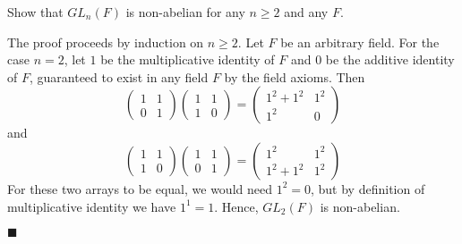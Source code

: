 \documentclass[12pt]{article}
\renewcommand{\qed}{\hfill$\blacksquare$}
\renewenvironment{proof}{\begin{addmargin}[1em]{0em}\begin{newproof}}{\end{newproof}\end{addmargin}\qed}
\newenvironment{problem}[2][Exercise]{\begin{trivlist}
\item[\hskip \labelsep {\bfseries #1}\hskip \labelsep {\bfseries #2.}]}{\end{trivlist}}
\begin{document}
\begin{problem}{1.4.8}
Show that $GL_n\left(F\right)$ is non-abelian for any $n\geq 2$ and any $F$.
\end{problem}
\begin{proof}
The proof proceeds by induction on $n\geq 2$. Let $F$ be an arbitrary field. For the case $n=2$, let $1$ be the multiplicative identity of $F$ and $0$ be the additive identity of $F$, guaranteed to exist in any field $F$ by the field axioms. Then
$$ \left(\begin{array}{cc} 1 & 1 \\ 0 & 1 \end{array}\right)\left(\begin{array}{cc} 1 & 1 \\ 1 & 0 \end{array}\right)=\left(\begin{array}{cc} 1^2+1^2 & 1^2 \\ 1^2 & 0 \end{array}\right)$$
and
$$\left(\begin{array}{cc} 1 & 1 \\ 1 & 0 \end{array}\right)\left(\begin{array}{cc} 1 & 1 \\ 0 & 1 \end{array}\right)=\left(\begin{array}{cc} 1^2 & 1^2 \\ 1^2+1^2 & 1^2 \end{array}\right)$$
For these two arrays to be equal, we would need $1^2 = 0$, but by definition of multiplicative identity we have $1^1 = 1$. Hence, $GL_2\left(F\right)$ is non-abelian.


\end{proof}
\end{document}
